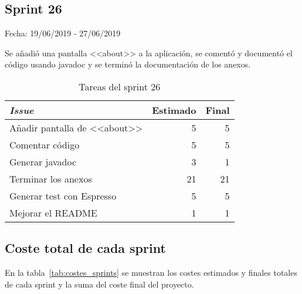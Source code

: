 \subsection{Sprint 26}

Fecha: 19/06/2019 - 27/06/2019

Se añadió una pantalla <<about>> a la aplicación, se comentó y documentó el código usando javadoc y se terminó la documentación de los anexos. 

\begin{table}[H]
	\begin{tabularx}{\textwidth}{Xrr}
		\toprule \textbf{\textit{Issue}} & \textbf{Estimado} & \textbf{Final}\\
		\toprule
		Añadir pantalla de <<about>> & 5 & 5 \\
		Comentar código & 5 & 5 \\
		Generar javadoc & 3 & 1 \\
		Terminar los anexos & 21 & 21 \\
		Generar test con Espresso & 5 & 5 \\
		Mejorar el README & 1 & 1 \\
		\bottomrule
	\end{tabularx}
	\caption{Tareas del sprint 26}
\end{table}

\subsection{Coste total de cada sprint}

En la tabla~\ref{tab:costes_sprints} se muestran los costes estimados y finales totales de cada sprint y la suma del coste final del proyecto. 

